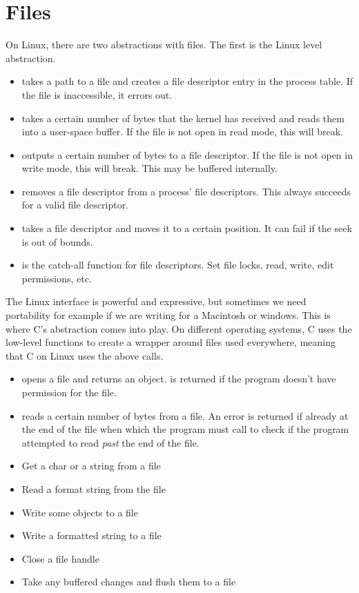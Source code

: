\section{Files}
	 
On Linux, there are two abstractions with files. The first is the Linux  level abstraction.
	 
\begin{itemize}
	\item {} takes a path to a file and creates a file descriptor entry in the process table. If the file is inaccessible, it errors out.
	\item {} takes a certain number of bytes that the kernel has received and reads them into a user-space buffer. If the file is not open in read mode, this will break.
	\item {} outputs a certain number of bytes to a file descriptor. If the file is not open in write mode, this will break. This may be buffered internally.
	\item {} removes a file descriptor from a process' file descriptors. This always succeeds for a valid file descriptor.
	\item {} takes a file descriptor and moves it to a certain position. It can fail if the seek is out of bounds.
	\item {} is the catch-all function for file descriptors. Set file locks, read, write, edit permissions, etc.
\end{itemize}
	 
The Linux interface is powerful and expressive, but sometimes we need portability for example if we are writing for a Macintosh or windows.
This is where C's abstraction comes into play.
On different operating systems, C uses the low-level functions to create a wrapper around files used everywhere, meaning that C on Linux uses the above calls.
	 
\begin{itemize}
	\item {} opens a file and returns an object.  is returned if the program doesn't have permission for the file.
	\item {} reads a certain number of bytes from a file. An error is returned if already at the end of the file when which the program must call  to check if the program attempted to read \textit{past} the end of the file.
	\item {} Get a char or a string from a file
	\item {} Read a format string from the file
	\item {} Write some objects to a file
	\item {} Write a formatted string to a file
	\item {} Close a file handle
	\item {} Take any buffered changes and flush them to a file
\end{itemize}
	 
